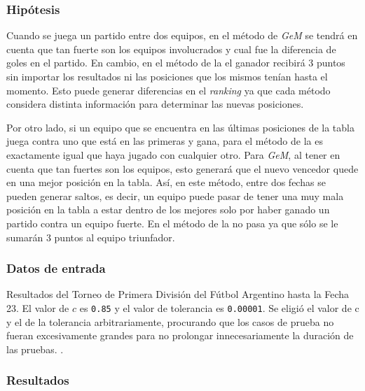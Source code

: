             \subsubsection*{Hipótesis}
            Cuando se juega un partido entre dos equipos, en el método de \emph{GeM} se tendrá en cuenta que tan fuerte son los equipos involucrados y cual fue la diferencia de goles en el partido. En cambio, en el método de la  el ganador recibirá 3 puntos sin importar los resultados ni las posiciones que los mismos tenían hasta el momento. Esto puede generar diferencias en el \emph{ranking} ya que cada método considera distinta información para determinar las nuevas posiciones.

            Por otro lado, si un equipo que se encuentra en las últimas posiciones de la tabla juega contra uno que está en las primeras y gana, para el método de la  es exactamente igual que haya jugado con cualquier otro. Para \emph{GeM}, al tener en cuenta que tan fuertes son los equipos, esto generará que el nuevo vencedor quede en una mejor posición en la tabla. Así, en este método, entre dos fechas se pueden generar saltos, es decir, un equipo puede pasar de tener una muy mala posición en la tabla a estar dentro de los mejores solo por haber ganado un partido contra un equipo fuerte. En el método de la  no pasa ya que sólo se le sumarán 3 puntos al equipo triunfador.

            \subsubsection*{Datos de entrada}
                Resultados del Torneo de Primera División del Fútbol Argentino hasta la Fecha 23. El valor de $c$ es \texttt{0.85} y el valor de tolerancia es \texttt{0.00001}. Se eligió el valor de c y el de la tolerancia arbitrariamente, procurando que los casos de prueba no fueran excesivamente grandes para no prolongar innecesariamente la duración de las pruebas.
.

            \subsubsection*{Resultados}

